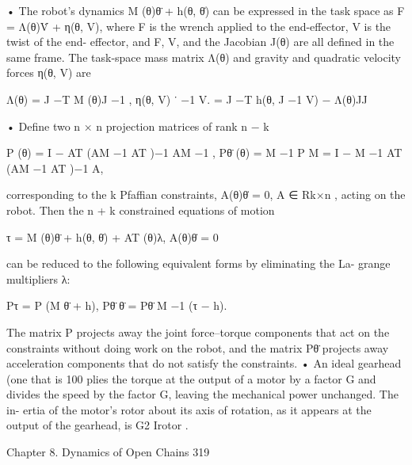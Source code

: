 \documentclass[12pt,a4paper]{article}
\begin{document}
      • The robot’s dynamics M (θ)θ̈ + h(θ, θ̇) can be expressed in the task space
        as
                                F = Λ(θ)V̇ + η(θ, V),
        where F is the wrench applied to the end-effector, V is the twist of the end-
        effector, and F, V, and the Jacobian J(θ) are all defined in the same frame.
        The task-space mass matrix Λ(θ) and gravity and quadratic velocity forces
        η(θ, V) are

                             Λ(θ)      = J −T M (θ)J −1 ,
                           η(θ, V)                                ˙ −1 V.
                                       = J −T h(θ, J −1 V) − Λ(θ)JJ

      • Define two n × n projection matrices of rank n − k

                     P (θ) = I − AT (AM −1 AT )−1 AM −1 ,
                     Pθ̈ (θ) = M −1 P M = I − M −1 AT (AM −1 AT )−1 A,

        corresponding to the k Pfaffian constraints, A(θ)θ̇ = 0, A ∈ Rk×n , acting
        on the robot. Then the n + k constrained equations of motion

                                  τ      = M (θ)θ̈ + h(θ, θ̇) + AT (θ)λ,
                              A(θ)θ̇     = 0

        can be reduced to the following equivalent forms by eliminating the La-
        grange multipliers λ:

                                       Pτ       = P (M θ̈ + h),
                                       Pθ̈ θ̈   = Pθ̈ M −1 (τ − h).

        The matrix P projects away the joint force–torque components that act
        on the constraints without doing work on the robot, and the matrix Pθ̈
        projects away acceleration components that do not satisfy the constraints.
      • An ideal gearhead (one that is 100%
        plies the torque at the output of a motor by a factor G and divides the
        speed by the factor G, leaving the mechanical power unchanged. The in-
        ertia of the motor’s rotor about its axis of rotation, as it appears at the
        output of the gearhead, is G2 Irotor .


Chapter 8. Dynamics of Open Chains                                                                  319
\end{document}
